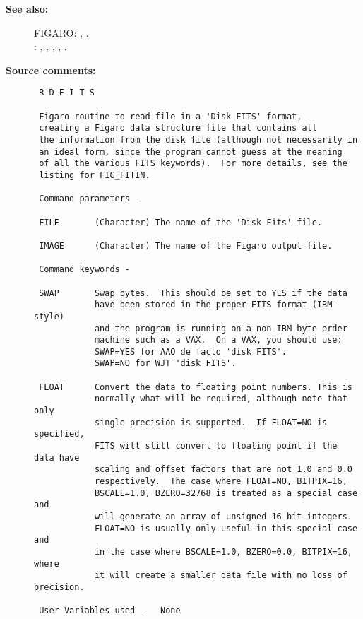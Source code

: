 \begin{description}
\item [{\bf See also:}]
FIGARO: , .\\
: , , , , .\\

\item [{\bf Source comments:}]
\begin{verbatim}
 R D F I T S

 Figaro routine to read file in a 'Disk FITS' format,
 creating a Figaro data structure file that contains all
 the information from the disk file (although not necessarily in
 an ideal form, since the program cannot guess at the meaning
 of all the various FITS keywords).  For more details, see the
 listing for FIG_FITIN.

 Command parameters -

 FILE       (Character) The name of the 'Disk Fits' file.

 IMAGE      (Character) The name of the Figaro output file.

 Command keywords -

 SWAP       Swap bytes.  This should be set to YES if the data
            have been stored in the proper FITS format (IBM-style)
            and the program is running on a non-IBM byte order
            machine such as a VAX.  On a VAX, you should use:
            SWAP=YES for AAO de facto 'disk FITS'.
            SWAP=NO for WJT 'disk FITS'.

 FLOAT      Convert the data to floating point numbers. This is
            normally what will be required, although note that only
            single precision is supported.  If FLOAT=NO is specified,
            FITS will still convert to floating point if the data have
            scaling and offset factors that are not 1.0 and 0.0
            respectively.  The case where FLOAT=NO, BITPIX=16,
            BSCALE=1.0, BZERO=32768 is treated as a special case and
            will generate an array of unsigned 16 bit integers.
            FLOAT=NO is usually only useful in this special case and
            in the case where BSCALE=1.0, BZERO=0.0, BITPIX=16, where
            it will create a smaller data file with no loss of precision.

 User Variables used -   None


\end{verbatim}
\end{description}
